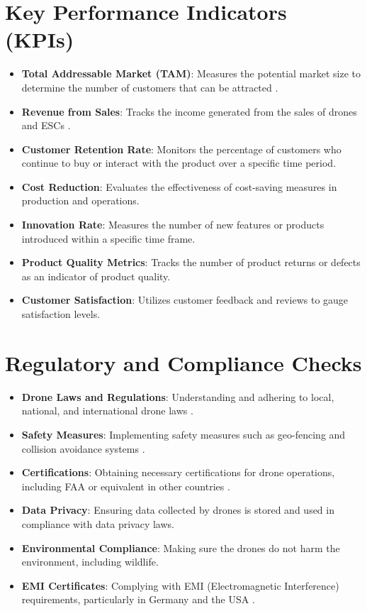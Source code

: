 \documentclass[12pt]{article}
\begin{document}
	
	\section{Key Performance Indicators (KPIs)}
		\begin{itemize}
			\item \textbf{Total Addressable Market (TAM)}: Measures the potential market size to determine the number of customers that can be attracted \cite{indeed-kpi}.
			\item \textbf{Revenue from Sales}: Tracks the income generated from the sales of drones and ESCs \cite{financialmodeltemplates}.
			\item \textbf{Customer Retention Rate}: Monitors the percentage of customers who continue to buy or interact with the product over a specific time period.
			\item \textbf{Cost Reduction}: Evaluates the effectiveness of cost-saving measures in production and operations.
			\item \textbf{Innovation Rate}: Measures the number of new features or products introduced within a specific time frame.
			\item \textbf{Product Quality Metrics}: Tracks the number of product returns or defects as an indicator of product quality.
			\item \textbf{Customer Satisfaction}: Utilizes customer feedback and reviews to gauge satisfaction levels.
		\end{itemize}
		
	
	\section{Regulatory and Compliance Checks}
	\begin{itemize}
		\item \textbf{Drone Laws and Regulations}: Understanding and adhering to local, national, and international drone laws \cite{drone-laws}.
		\item \textbf{Safety Measures}: Implementing safety measures such as geo-fencing and collision avoidance systems \cite{safety-first}.
		\item \textbf{Certifications}: Obtaining necessary certifications for drone operations, including FAA or equivalent in other countries \cite{uas-operators}.
		\item \textbf{Data Privacy}: Ensuring data collected by drones is stored and used in compliance with data privacy laws.
		\item \textbf{Environmental Compliance}: Making sure the drones do not harm the environment, including wildlife.
		\item \textbf{EMI Certificates}: Complying with EMI (Electromagnetic Interference) requirements, particularly in Germany and the USA \cite{emi-germany} \cite{emi-usa}.
	\end{itemize}
	
\end{document}
